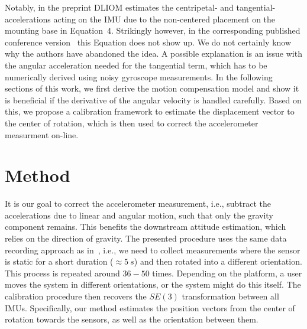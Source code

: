 \documentclass[journal]{IEEEtran}
\begin{document}
Notably, in the preprint DLIOM estimates the centripetal- and tangential-accelerations acting on the IMU due to the non-centered placement on the mounting base in Equation~4.
Strikingly however, in the corresponding published conference version~\cite{10160508} this Equation does not show up.
We do not certainly know why the authors have abandoned the idea.
A possible explanation is an issue with the angular acceleration needed for the tangential term, which has to be numerically derived using noisy gyroscope measurements. 
In the following sections of this work, we first derive the motion compensation model and show it is beneficial if the derivative of the angular velocity is handled carefully.
Based on this, we propose a calibration framework to estimate the displacement vector to the center of rotation, which is then used to correct the accelerometer measurment on-line. 

\section{Method}
It is our goal to correct the accelerometer measurement, i.e., subtract the accelerations due to linear and angular motion, such that only the gravity component remains. 
This benefits the downstream attitude estimation, which relies on the direction of gravity.
The presented procedure uses the same data recording approach as in~\cite{imutk2014}, i.e., we need to collect measurements where the sensor is static for a short duration ($\approx 5~s$) and then rotated into a different orientation.
This process is repeated around $36 - 50$ times.
Depending on the platform, a user moves the system in different orientations, or the system might do this itself. 
The calibration procedure then recovers the $SE(3)$ transformation between all IMUs.
Specifically, our method estimates the position vectors from the center of rotation towards the sensors, as well as the orientation between them.
\end{document}
